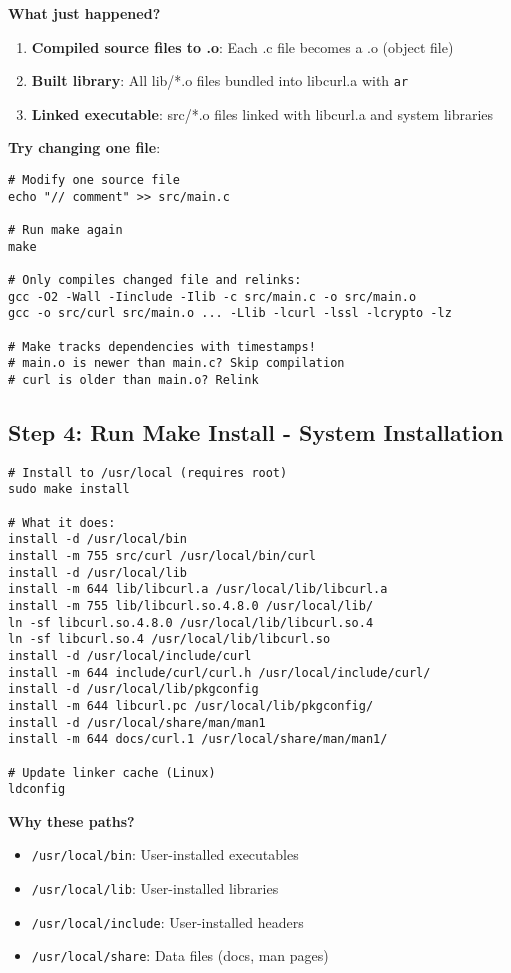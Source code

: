 \textbf{What just happened?}

\begin{enumerate}
    \item \textbf{Compiled source files to .o}: Each .c file becomes a .o (object file)
    \item \textbf{Built library}: All lib/*.o files bundled into libcurl.a with \texttt{ar}
    \item \textbf{Linked executable}: src/*.o files linked with libcurl.a and system libraries
\end{enumerate}

\textbf{Try changing one file}:

\begin{lstlisting}
# Modify one source file
echo "// comment" >> src/main.c

# Run make again
make

# Only compiles changed file and relinks:
gcc -O2 -Wall -Iinclude -Ilib -c src/main.c -o src/main.o
gcc -o src/curl src/main.o ... -Llib -lcurl -lssl -lcrypto -lz

# Make tracks dependencies with timestamps!
# main.o is newer than main.c? Skip compilation
# curl is older than main.o? Relink
\end{lstlisting}

\subsection{Step 4: Run Make Install - System Installation}

\begin{lstlisting}
# Install to /usr/local (requires root)
sudo make install

# What it does:
install -d /usr/local/bin
install -m 755 src/curl /usr/local/bin/curl
install -d /usr/local/lib
install -m 644 lib/libcurl.a /usr/local/lib/libcurl.a
install -m 755 lib/libcurl.so.4.8.0 /usr/local/lib/
ln -sf libcurl.so.4.8.0 /usr/local/lib/libcurl.so.4
ln -sf libcurl.so.4 /usr/local/lib/libcurl.so
install -d /usr/local/include/curl
install -m 644 include/curl/curl.h /usr/local/include/curl/
install -d /usr/local/lib/pkgconfig
install -m 644 libcurl.pc /usr/local/lib/pkgconfig/
install -d /usr/local/share/man/man1
install -m 644 docs/curl.1 /usr/local/share/man/man1/

# Update linker cache (Linux)
ldconfig
\end{lstlisting}

\textbf{Why these paths?}

\begin{itemize}
    \item \texttt{/usr/local/bin}: User-installed executables
    \item \texttt{/usr/local/lib}: User-installed libraries
    \item \texttt{/usr/local/include}: User-installed headers
    \item \texttt{/usr/local/share}: Data files (docs, man pages)
\end{itemize}

